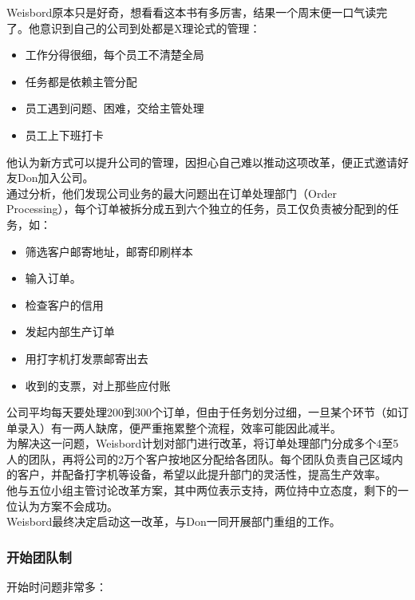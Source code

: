 Weisbord原本只是好奇，想看看这本书有多厉害，结果一个周末便一口气读完了。他意识到自己的公司到处都是X理论式的管理：

\begin{itemize}
\tightlist
\item
  工作分得很细，每个员工不清楚全局
\item
  任务都是依赖主管分配
\item
  员工遇到问题、困难，交给主管处理
\item
  员工上下班打卡
\end{itemize}

他认为新方式可以提升公司的管理，因担心自己难以推动这项改革，便正式邀请好友Don加入公司。\\
通过分析，他们发现公司业务的最大问题出在订单处理部门（Order Processing），每个订单被拆分成五到六个独立的任务，员工仅负责被分配到的任务，如：


\begin{itemize}
\tightlist
\item
  筛选客户邮寄地址，邮寄印刷样本
\item
  输入订单。
\item
  检查客户的信用
\item
  发起内部生产订单
\item
  用打字机打发票邮寄出去
\item
  收到的支票，对上那些应付账\\
\end{itemize}

公司平均每天要处理200到300个订单，但由于任务划分过细，一旦某个环节（如订单录入）有一两人缺席，便严重拖累整个流程，效率可能因此减半。\\
为解决这一问题，Weisbord计划对部门进行改革，将订单处理部门分成多个4至5人的团队，再将公司的2万个客户按地区分配给各团队。每个团队负责自己区域内的客户，并配备打字机等设备，希望以此提升部门的灵活性，提高生产效率。\\

他与五位小组主管讨论改革方案，其中两位表示支持，两位持中立态度，剩下的一位认为方案不会成功。\\
Weisbord最终决定启动这一改革，与Don一同开展部门重组的工作。


\hypertarget{ux5f00ux59cbux56e2ux961fux5236}{%
\subsubsection{开始团队制}\label{ux5f00ux59cbux56e2ux961fux5236}}

开始时问题非常多：

